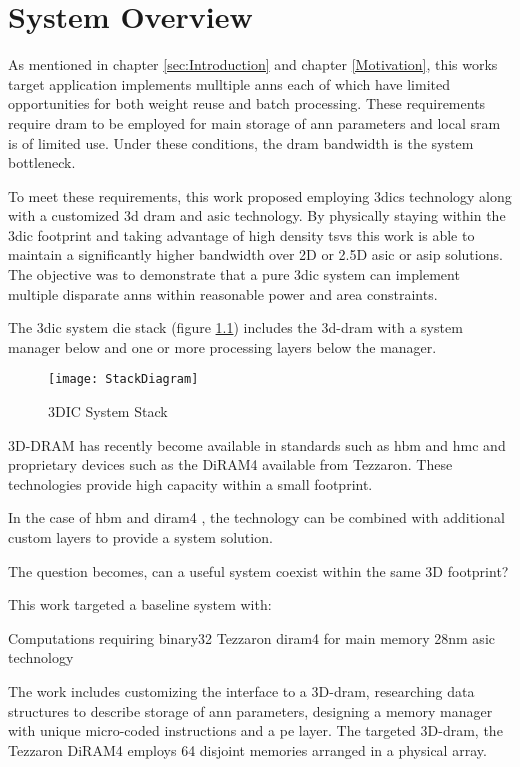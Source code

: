 



\chapter{System Overview}
\label{chap-five}
\label{sec:System Overview}
As mentioned in chapter \ref{sec:Introduction} and chapter \ref{Motivation}, this works target application implements mulltiple \acp{ann} each of which have limited opportunities for both weight reuse and batch processing.
These requirements require \ac{dram} to be employed for main storage of \ac{ann} parameters and local \ac{sram} is of limited use.
Under these conditions, the \ac{dram} bandwidth is the system bottleneck.

To meet these requirements, this work proposed employing \acp{3dic} technology along with a customized \ac{3d} \ac{dram} and \ac{asic} technology. 
By physically staying within the \ac{3dic} footprint and taking advantage of high density \acp{tsv} this work is able to maintain a significantly higher bandwidth over 2D or 2.5D \ac{asic} or \ac{asip} solutions.
The objective was to demonstrate that a pure \ac{3dic} system can implement multiple disparate \acp{ann} within reasonable power and area constraints. 

The \ac{3dic} system die stack (figure \ref{fig:3DICStack}) includes the \ac{3d}-\ac{dram} with a system manager below and one or more processing layers below the manager.
\begin{figure}[!t]
\centering
\captionsetup{justification=centering}
\captionsetup{width=.9\linewidth}
\centerline{
\mbox{\texttt{[image: StackDiagram]}}
}
\caption{3DIC System Stack}
\label{fig:3DICStack}
\end{figure}

3D-DRAM has recently become available in standards such as \ac{hbm} and \ac{hmc} and proprietary devices such as the DiRAM4 available from Tezzaron. 
These technologies provide high capacity within a small footprint.

In the case of \ac{hbm} and \ac{diram4} \cite{tezzaron:diram4}, the technology can be combined with additional custom layers to provide a system solution.

The question becomes, can a useful system coexist within the same 3D footprint?

This work targeted a baseline system with:
\begin{outline}
  \1 Computations requiring \ac{binary32}
  \1 Tezzaron \acf{diram4} \cite{tezzaron:diram4} for main memory
  \1 28nm \ac{asic} technology
\end{outline}
The work includes customizing the interface to a 3D-\ac{dram}, researching data structures to describe storage of \ac{ann} parameters, designing a memory manager with unique micro-coded instructions and a \ac{pe} layer.  
The targeted 3D-\ac{dram}, the Tezzaron DiRAM4 employs 64 disjoint memories arranged in a physical array.

